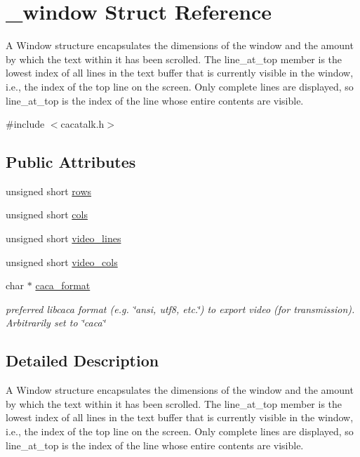 \hypertarget{struct__window}{\section{\-\_\-window \-Struct \-Reference}
\label{struct__window}
}


\-A \-Window structure encapsulates the dimensions of the window and the amount by which the text within it has been scrolled. \-The line\-\_\-at\-\_\-top member is the lowest index of all lines in the text buffer that is currently visible in the window, i.\-e., the index of the top line on the screen. \-Only complete lines are displayed, so line\-\_\-at\-\_\-top is the index of the line whose entire contents are visible.  




{\ttfamily \#include $<$cacatalk.\-h$>$}

\subsection*{\-Public \-Attributes}
\begin{DoxyCompactItemize}
\item 
unsigned short \hyperlink{struct__window_a59cb44669700308b223c28bd0abf45a2}{rows}
\item 
unsigned short \hyperlink{struct__window_a58d23390d6af61cfd5ee37d288278ca7}{cols}
\item 
unsigned short \hyperlink{struct__window_a9bd45de653040c0b3b9c725df5f88b2d}{video\-\_\-lines}
\item 
unsigned short \hyperlink{struct__window_a801a0717b1dd18a92878ab36a4176b42}{video\-\_\-cols}
\item 
char $\ast$ \hyperlink{struct__window_a0fb378fdccd70a6f0d41c5150958def6}{caca\-\_\-format}
\begin{DoxyCompactList}\small\item\em preferred libcaca format (e.\-g. \char`\"{}ansi, utf8, etc.\char`\"{}) to export video (for transmission). \-Arbitrarily set to \char`\"{}caca\char`\"{} \end{DoxyCompactList}\end{DoxyCompactItemize}


\subsection{\-Detailed \-Description}
\-A \-Window structure encapsulates the dimensions of the window and the amount by which the text within it has been scrolled. \-The line\-\_\-at\-\_\-top member is the lowest index of all lines in the text buffer that is currently visible in the window, i.\-e., the index of the top line on the screen. \-Only complete lines are displayed, so line\-\_\-at\-\_\-top is the index of the line whose entire contents are visible. 

